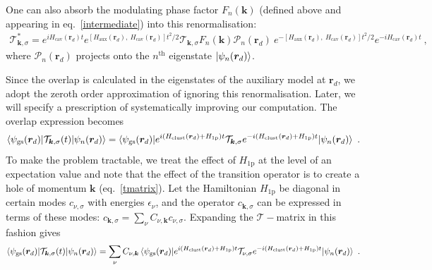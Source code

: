 One can also absorb the modulating phase factor \(F_n(\bm k)\) (defined above and appearing in eq.~\ref{intermediate}) into this renormalisation:
\begin{equation}\begin{aligned}\label{Zassenhaus}
	\mathcal{T}_{{\bm k},\sigma}^* = e^{i H_\text{cav}(\bm r_d)t}e^{[H_\text{aux}(\bm r_d),~H_\text{cav}(\bm r_d)]t^2/2}\mathcal{T}_{{\bm k},\sigma}F_n(\bm k) \mathcal{P}_n({\bm r_d})~e^{-[H_\text{aux}(\bm r_d),~H_\text{cav}(\bm r_d)]t^2/2}e^{-i H_\text{cav}(\bm r_d)t}~,
\end{aligned}\end{equation}
where \(\mathcal{P}_n({\bm r_d})\) projects onto the \(n^\text{th}\) eigenstate \(\ket{\psi_{n}({\bm r_d})}\).

Since the overlap is calculated in the eigenstates of the auxiliary model at \(\bm r_d\), we adopt the zeroth order approximation of ignoring this renormalisation. Later, we will specify a prescription of systematically improving our computation. The overlap expression becomes
\begin{equation}\begin{aligned}
	\braket{\psi_\text{gs}({\bm r_d}) | \mathcal{T}_{{\bm k},\sigma}(t) | \psi_{n}({\bm r_d})} = \braket{\psi_\text{gs}({\bm r_d}) | e^{i(H_\text{clust}(\bm r_d) + H_\text{1p})t} \mathcal{T}_{{\bm k},\sigma} e^{-i(H_\text{clust}(\bm r_d) + H_\text{1p})t} | \psi_{n}({\bm r_d})}~.
\end{aligned}\end{equation}
To make the problem tractable, we treat the effect of \(H_\text{1p}\) at the level of an expectation value and note that the effect of the transition operator is to create a hole of momentum \(\bm k\) (eq.~\ref{tmatrix}). Let the Hamiltonian \(H_\text{1p}\) be diagonal in certain modes \(c_{\nu,\sigma}\) with energies \(\epsilon_\nu\), and the operator \(c_{\bm k,\sigma}\) can be expressed in terms of these modes: \(c_{\bm k,\sigma} = \sum_{\nu}C_{\nu,\bm k}c_{\nu,\sigma}\). Expanding the \(\mathcal{T}-\)matrix in this fashion gives
\begin{equation}\begin{aligned}
	\braket{\psi_\text{gs}({\bm r_d}) | \mathcal{T}_{{\bm k},\sigma}(t) | \psi_{n}({\bm r_d})} = \sum_{\nu}C_{\nu,\bm k}\braket{\psi_\text{gs}({\bm r_d}) | e^{i(H_\text{clust}(\bm r_d) + H_\text{1p})t} \mathcal{T}_{\nu,\sigma} e^{-i(H_\text{clust}(\bm r_d) + H_\text{1p})t} | \psi_{n}({\bm r_d})}~.
\end{aligned}\end{equation}
